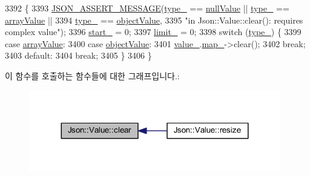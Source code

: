 \begin{DoxyCode}
3392                   \{
3393   \hyperlink{json_8h_ad7facdeeca0f495765e3b204c265eadb}{JSON\_ASSERT\_MESSAGE}(\hyperlink{class_json_1_1_value_abd222c2536dc88bf330dedcd076d2356}{type\_} == \hyperlink{namespace_json_a7d654b75c16a57007925868e38212b4ea7d9899633b4409bd3fc107e6737f8391}{nullValue} || 
      \hyperlink{class_json_1_1_value_abd222c2536dc88bf330dedcd076d2356}{type\_} == \hyperlink{namespace_json_a7d654b75c16a57007925868e38212b4eadc8f264f36b55b063c78126b335415f4}{arrayValue} ||
3394                           \hyperlink{class_json_1_1_value_abd222c2536dc88bf330dedcd076d2356}{type\_} == \hyperlink{namespace_json_a7d654b75c16a57007925868e38212b4eae8386dcfc36d1ae897745f7b4f77a1f6}{objectValue},
3395                       \textcolor{stringliteral}{"in Json::Value::clear(): requires complex value"});
3396   \hyperlink{class_json_1_1_value_a1c3aeb0fa8fefe93776cb347c76a25a8}{start\_} = 0;
3397   \hyperlink{class_json_1_1_value_afe377e25f6d3b5b8ea7221c84f29412a}{limit\_} = 0;
3398   \textcolor{keywordflow}{switch} (\hyperlink{class_json_1_1_value_abd222c2536dc88bf330dedcd076d2356}{type\_}) \{
3399   \textcolor{keywordflow}{case} \hyperlink{namespace_json_a7d654b75c16a57007925868e38212b4eadc8f264f36b55b063c78126b335415f4}{arrayValue}:
3400   \textcolor{keywordflow}{case} \hyperlink{namespace_json_a7d654b75c16a57007925868e38212b4eae8386dcfc36d1ae897745f7b4f77a1f6}{objectValue}:
3401     \hyperlink{class_json_1_1_value_aef578244546212705b9f81eb84d7e151}{value\_}.\hyperlink{union_json_1_1_value_1_1_value_holder_a1e7a5b86d4f52234f55c847ad1ce389a}{map\_}->clear();
3402     \textcolor{keywordflow}{break};
3403   \textcolor{keywordflow}{default}:
3404     \textcolor{keywordflow}{break};
3405   \}
3406 \}
\end{DoxyCode}
이 함수를 호출하는 함수들에 대한 그래프입니다.\+:\nopagebreak
\begin{figure}[H]
\begin{center}
\leavevmode
\includegraphics[width=311pt]{class_json_1_1_value_a501a4d67e6c875255c2ecc03ccd2019b_icgraph}
\end{center}
\end{figure}
\mbox{\label{class_json_1_1_value_aefa4464ca1bb0bcc9a87b38ed62ca2e0}} 
